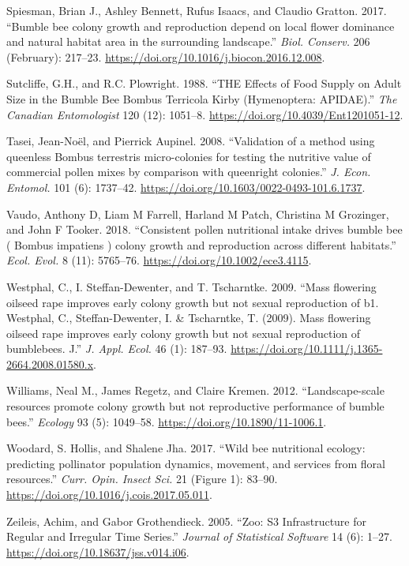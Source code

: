 \documentclass[11pt,]{article}
\begin{document}
\leavevmode\hypertarget{ref-Spiesman2017}{}%
Spiesman, Brian J., Ashley Bennett, Rufus Isaacs, and Claudio Gratton.
2017. ``Bumble bee colony growth and reproduction depend on local flower
dominance and natural habitat area in the surrounding landscape.''
\emph{Biol. Conserv.} 206 (February): 217--23.
\url{https://doi.org/10.1016/j.biocon.2016.12.008}.

\leavevmode\hypertarget{ref-Sutcliffe1988}{}%
Sutcliffe, G.H., and R.C. Plowright. 1988. ``THE Effects of Food Supply
on Adult Size in the Bumble Bee Bombus Terricola Kirby (Hymenoptera:
APIDAE).'' \emph{The Canadian Entomologist} 120 (12): 1051--8.
\url{https://doi.org/10.4039/Ent1201051-12}.

\leavevmode\hypertarget{ref-Tasei2008}{}%
Tasei, Jean-Noël, and Pierrick Aupinel. 2008. ``Validation of a method
using queenless Bombus terrestris micro-colonies for testing the
nutritive value of commercial pollen mixes by comparison with queenright
colonies.'' \emph{J. Econ. Entomol.} 101 (6): 1737--42.
\url{https://doi.org/10.1603/0022-0493-101.6.1737}.

\leavevmode\hypertarget{ref-Vaudo2018}{}%
Vaudo, Anthony D, Liam M Farrell, Harland M Patch, Christina M
Grozinger, and John F Tooker. 2018. ``Consistent pollen nutritional
intake drives bumble bee ( Bombus impatiens ) colony growth and
reproduction across different habitats.'' \emph{Ecol. Evol.} 8 (11):
5765--76. \url{https://doi.org/10.1002/ece3.4115}.

\leavevmode\hypertarget{ref-Westphal2009a}{}%
Westphal, C., I. Steffan-Dewenter, and T. Tscharntke. 2009. ``Mass
flowering oilseed rape improves early colony growth but not sexual
reproduction of b1. Westphal, C., Steffan-Dewenter, I. \& Tscharntke, T.
(2009). Mass flowering oilseed rape improves early colony growth but not
sexual reproduction of bumblebees. J.'' \emph{J. Appl. Ecol.} 46 (1):
187--93. \url{https://doi.org/10.1111/j.1365-2664.2008.01580.x}.

\leavevmode\hypertarget{ref-Williams2012b}{}%
Williams, Neal M., James Regetz, and Claire Kremen. 2012.
``Landscape-scale resources promote colony growth but not reproductive
performance of bumble bees.'' \emph{Ecology} 93 (5): 1049--58.
\url{https://doi.org/10.1890/11-1006.1}.

\leavevmode\hypertarget{ref-Woodard2017}{}%
Woodard, S. Hollis, and Shalene Jha. 2017. ``Wild bee nutritional
ecology: predicting pollinator population dynamics, movement, and
services from floral resources.'' \emph{Curr. Opin. Insect Sci.} 21
(Figure 1): 83--90. \url{https://doi.org/10.1016/j.cois.2017.05.011}.

\leavevmode\hypertarget{ref-zoo}{}%
Zeileis, Achim, and Gabor Grothendieck. 2005. ``Zoo: S3 Infrastructure
for Regular and Irregular Time Series.'' \emph{Journal of Statistical
Software} 14 (6): 1--27. \url{https://doi.org/10.18637/jss.v014.i06}.
\end{document}
